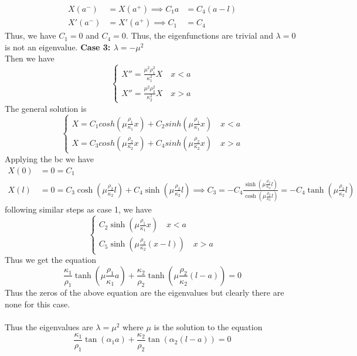 \documentclass[answers,12pt,addpoints]{exam}
\begin{document}
\begin{questions}
\begin{solution}
\begin{align*}
            X(a^-) &= X(a^+) \implies C_1 a &= C_4 (a-l)\\
            X'(a^-) &= X'(a^+) \implies C_1 &= C_4
        \end{align*}
        Thus, we have $C_1 = 0$ and $C_4 = 0$. Thus, the eigenfunctions are trivial and $\lambda = 0$ is not an eigenvalue.
        \textbf{Case 3: $\lambda = -\mu^2$} \\
        Then we have
        $$\begin{cases}
            X'' = \frac{\mu^2 \rho_1^2}{\kappa_1^2} X \quad x < a \\
            X'' = \frac{\mu^2 \rho_2^2}{\kappa_2^2} X \quad x > a
        \end{cases}$$
        The general solution is
        $$\begin{cases}
            X = C_1 cosh(\mu\frac{\rho_1}{\kappa_1}x) + C_2 sinh(\mu\frac{\rho_1}{\kappa_1}x) \quad x < a \\
            X = C_3 cosh(\mu\frac{\rho_2}{\kappa_2}x) + C_4 sinh(\mu\frac{\rho_2}{\kappa_2}x) \quad x > a
        \end{cases}$$
        Applying the bc we have
        \begin{align*}
            X(0) &= 0 = C_1 \\
            X(l) &= 0 = C_3 \cosh(\mu\frac{\rho_2}{\kappa_2}l) + C_4 \sinh(\mu\frac{\rho_2}{\kappa_2}l) \implies C_3 = -C_4 \frac{\sinh(\mu\frac{\rho_2}{\kappa_2}l)}{\cosh(\mu\frac{\rho_2}{\kappa_2}l)} = -C_4 \tanh(\mu\frac{\rho_2}{\kappa_2}l)
        \end{align*}
        following similar steps as case 1, we have
        $$\begin{cases}
            C_2 \sinh(\mu\frac{\rho_1}{\kappa_1}x) \quad x < a \\
            C_5 \sinh(\mu\frac{\rho_2}{\kappa_2}(x-l)) \quad x > a
        \end{cases}$$
        Thus we get the equation
        $$ \frac{\kappa_1}{\rho_1} \tanh(\mu\frac{\rho_1}{\kappa_1} a) + \frac{\kappa_2}{\rho_2} \tanh(\mu\frac{\rho_2}{\kappa_2} (l-a)) = 0$$
        Thus the zeros of the above equation are the eigenvalues but clearly there are none for this case.\\\\
        Thus the eigenvalues are $\lambda = \mu^2$ where $\mu$ is the solution to the equation
        $$ \frac{\kappa_1}{\rho_1} \tan(\alpha_1 a) + \frac{\kappa_2}{\rho_2} \tan(\alpha_2 (l-a)) = 0$$
    \end{solution}

\end{questions}
\end{document}
